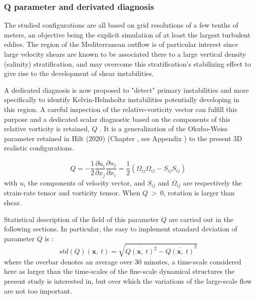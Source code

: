 \subsubsection{Q parameter and derivated diagnosis}
\label{sectiondiagQ}

The studied configurations are all based on grid resolutions of a few tenths of meters, an objective being the explicit simulation of at least the largest turbulent eddies. The region of the Mediterranean outflow is of particular interest since large velocity shears are known to be associated there to a large vertical density (salinity) stratification, and may overcome this stratification's stabilizing effect to give rise to the development of shear instabilities. 

A dedicated diagnosis is now proposed to "detect" primary instabilities and more specifically to identify Kelvin-Helmholtz instabilities potentially developing in this region. 
A careful inspection of the relative-vorticity vector can fulfill this purpose and a dedicated scalar diagnostic based on the components of this relative vorticity is retained, $Q$ \citep{cucitore_1999}. It is a generalization of the Okubo-Weiss parameter retained in Hilt (2020) (Chapter , see Appendix ) to the present 3D realistic configurations. 

\begin{equation}
Q=-\frac{1}{2} \frac{\partial u_i}{\partial x_j} \frac{\partial u_j}{\partial x_i} = \frac{1}{2} (\Omega_{ij}\Omega_{ij} - S_{ij} S_{ij})
\end{equation}
with $u_i$ the components of velocity vector, and $S_{ij}$ and $\Omega_{ij}$ are respectively the strain-rate tensor and vorticity tensor. When $Q\ >\ 0$, rotation is larger than shear.

Statistical description of the field of this parameter $Q$ are carried out in the following sections. In particular, the easy to implement standard deviation of parameter $Q$ is :
\begin{equation} 
\label{eqstdQ} 
    std ( Q ) (\mathbf{x},\ t)=  \sqrt{   \overline{Q (\mathbf{x},\ t)^{2}} -  \overline{Q(\mathbf{x},\ t)}^{2}  }
\end{equation}
where the overbar denotes an average over 30 minutes, a time-scale considered here as larger than the time-scales of the fine-scale dynamical structures the present study is interested in, but over which the variations of the large-scale flow are not too important.


